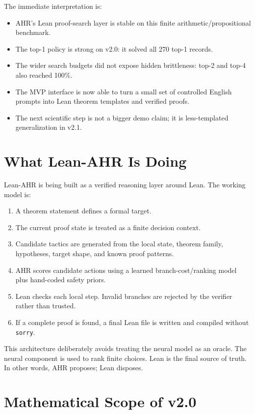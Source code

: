 \documentclass[11pt]{article}
\begin{document}
The immediate interpretation is:

\begin{itemize}
  \item AHR's Lean proof-search layer is stable on this finite arithmetic/propositional benchmark.
  \item The top-1 policy is strong on v2.0: it solved all 270 top-1 records.
  \item The wider search budgets did not expose hidden brittleness: top-2 and top-4 also reached 100\%.
  \item The MVP interface is now able to turn a small set of controlled English prompts into Lean theorem templates and verified proofs.
  \item The next scientific step is not a bigger demo claim; it is less-templated generalization in v2.1.
\end{itemize}

\section{What Lean-AHR Is Doing}

Lean-AHR is being built as a verified reasoning layer around Lean. The working model is:

\begin{enumerate}
  \item A theorem statement defines a formal target.
  \item The current proof state is treated as a finite decision context.
  \item Candidate tactics are generated from the local state, theorem family, hypotheses, target shape, and known proof patterns.
  \item AHR scores candidate actions using a learned branch-cost/ranking model plus hand-coded safety priors.
  \item Lean checks each local step. Invalid branches are rejected by the verifier rather than trusted.
  \item If a complete proof is found, a final Lean file is written and compiled without \texttt{sorry}.
\end{enumerate}

This architecture deliberately avoids treating the neural model as an oracle. The neural component is used to rank
finite choices. Lean is the final source of truth. In other words, AHR proposes; Lean disposes.

\section{Mathematical Scope of v2.0}
\end{document}
